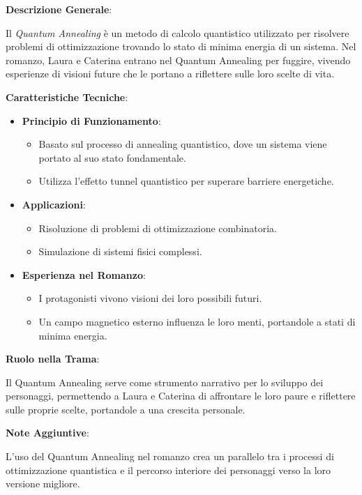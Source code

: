 \vspace{0.5cm}

\begin{tcolorbox}[colback=white,colframe=black,title=\textbf{Quantum Annealing}]
\begin{multicols}{2}
\textbf{Descrizione Generale}:

Il \emph{Quantum Annealing} è un metodo di calcolo quantistico utilizzato per risolvere problemi di ottimizzazione trovando lo stato di minima energia di un sistema. Nel romanzo, Laura e Caterina entrano nel Quantum Annealing per fuggire, vivendo esperienze di visioni future che le portano a riflettere sulle loro scelte di vita.

\textbf{Caratteristiche Tecniche}:

\begin{itemize}
    \item \textbf{Principio di Funzionamento}:
    \begin{itemize}
        \item Basato sul processo di annealing quantistico, dove un sistema viene portato al suo stato fondamentale.
        \item Utilizza l'effetto tunnel quantistico per superare barriere energetiche.
    \end{itemize}
    \item \textbf{Applicazioni}:
    \begin{itemize}
        \item Risoluzione di problemi di ottimizzazione combinatoria.
        \item Simulazione di sistemi fisici complessi.
    \end{itemize}
    \item \textbf{Esperienza nel Romanzo}:
    \begin{itemize}
        \item I protagonisti vivono visioni dei loro possibili futuri.
        \item Un campo magnetico esterno influenza le loro menti, portandole a stati di minima energia.
    \end{itemize}
\end{itemize}

\textbf{Ruolo nella Trama}:

Il Quantum Annealing serve come strumento narrativo per lo sviluppo dei personaggi, permettendo a Laura e Caterina di affrontare le loro paure e riflettere sulle proprie scelte, portandole a una crescita personale.

\textbf{Note Aggiuntive}:

L'uso del Quantum Annealing nel romanzo crea un parallelo tra i processi di ottimizzazione quantistica e il percorso interiore dei personaggi verso la loro versione migliore.

\end{multicols}
\end{tcolorbox}

